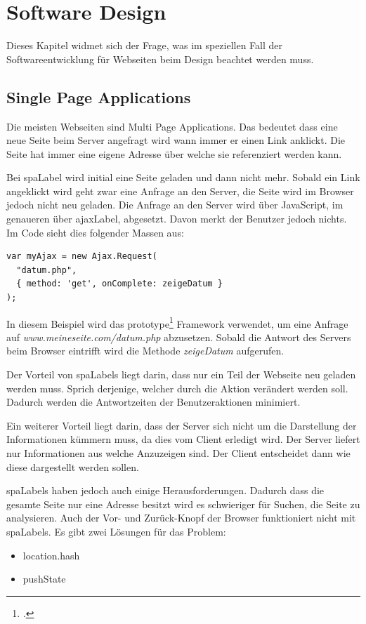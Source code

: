 \setcounter{secnumdepth}{3}
\chapter{Software Design}
Dieses Kapitel widmet sich der Frage, was im speziellen Fall der Softwareentwicklung für Webseiten beim Design beachtet werden muss.

\section{Single Page Applications}
\label{sec:softwaredesign:singlepageapplications}
Die meisten Webseiten sind Multi Page Applications. Das bedeutet dass eine neue Seite beim Server angefragt wird wann immer er einen Link anklickt. Die Seite hat immer eine eigene Adresse über welche sie referenziert werden kann.

Bei \gls{spaLabel} wird initial eine Seite geladen und dann nicht mehr. Sobald ein Link angeklickt wird geht zwar eine Anfrage an den Server, die Seite wird im Browser jedoch nicht neu geladen. Die Anfrage an den Server wird über JavaScript, im genaueren über \gls{ajaxLabel}, abgesetzt. Davon merkt der Benutzer jedoch nichts. Im Code sieht dies folgender Massen aus:

\begin{lstlisting}
var myAjax = new Ajax.Request(
  "datum.php",
  { method: 'get', onComplete: zeigeDatum }
);
\end{lstlisting}

In diesem Beispiel wird das prototype\footcite{Prototype_JavaScript_framework_a_foundation_for_ambitious_web_applications_2015-06-07} Framework verwendet, um eine Anfrage auf \textit{www.meineseite.com/datum.php} abzusetzen. Sobald die Antwort des Servers beim Browser eintrifft wird die Methode \textit{zeigeDatum} aufgerufen.

Der Vorteil von \glspl{spaLabel} liegt darin, dass nur ein Teil der Webseite neu geladen werden muss. Sprich derjenige, welcher durch die Aktion verändert werden soll. Dadurch werden die Antwortzeiten der Benutzeraktionen minimiert.

Ein weiterer Vorteil liegt darin, dass der Server sich nicht um die Darstellung der Informationen kümmern muss, da dies vom Client erledigt wird. Der Server liefert nur Informationen aus welche Anzuzeigen sind. Der Client entscheidet dann wie diese dargestellt werden sollen.

\glspl{spaLabel} haben jedoch auch einige Herausforderungen. Dadurch dass die gesamte Seite nur eine Adresse besitzt wird es schwieriger für Suchen, die Seite zu analysieren. Auch der Vor- und Zurück-Knopf der Browser funktioniert nicht mit \glspl{spaLabel}. Es gibt zwei Lösungen für das Problem:
\begin{itemize}
\item location.hash
\item pushState
\end{itemize}

